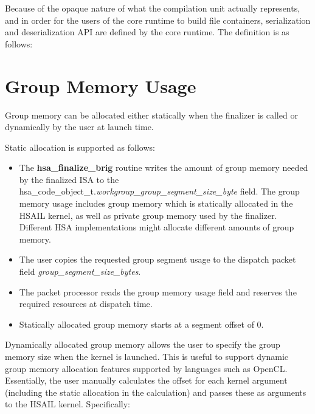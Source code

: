 \documentclass{book}
\newcommand{\reffun}[1]{\textbf{#1}}
\newcommand{\reffld}[1]{\textit{#1}}
\newcommand{\reftyp}[1]{#1}
\begin{document}
\begin{appendices}
Because of the opaque nature of what the compilation unit actually
represents, and in order for the users of the core runtime to build
file containers, serialization and deserialization API are defined
by the core runtime. The definition is as follows:



\hypertarget{coreapi_group_mem}{}\section{Group Memory
Usage}\label{coreapi_group_mem}
Group memory can be allocated either statically when the finalizer
is called or dynamically by the user at launch time.

Static allocation is supported as follows\-:
\begin{itemize}
\item The \reffun{hsa\_finalize\_brig} routine writes the amount of
group memory needed by the finalized ISA to the
\reftyp{hsa\_code\_object\_t}.\reffld{workgroup\_group\_segment\_size\_byte}
field.  The group memory usage includes group memory which is
statically allocated in the HSAIL kernel, as well as private
group memory used by the finalizer. Different HSA
implementations might allocate different amounts of group memory.

\item The user copies the requested group segment usage to the
  dispatch packet field \reffld{group\_segment\_size\_bytes}.

\item The packet processor reads the group memory usage field and
reserves the required resources at dispatch time.

\item Statically allocated group memory starts at a segment offset
of 0.

\end{itemize}

Dynamically allocated group memory allows the user to specify the
group memory size when the kernel is launched. This is useful to
support dynamic group memory allocation features supported by
languages such as OpenCL. Essentially, the user manually
calculates the offset for each kernel argument (including the static
allocation in the calculation) and passes these as arguments to the
HSAIL kernel. Specifically:

\begin{itemize}


\end{itemize}
\end{appendices}
\end{document}
